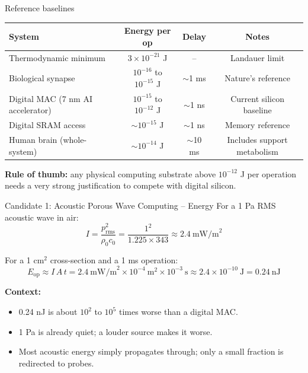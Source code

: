 \documentclass[aspectratio=169,11pt]{beamer}
\begin{document}
\begin{frame}{Reference baselines}
  \small
  \begin{center}
    \begin{tabular}{lccc}
      \toprule
      System & Energy per op & Delay & Notes \\
      \midrule
      Thermodynamic minimum & $3 \times 10^{-21}$ J & -- & Landauer limit \\
      Biological synapse & $10^{-16}$ to $10^{-15}$ J & $\sim$1 ms & Nature's reference \\
      Digital MAC (7 nm AI accelerator) & $10^{-15}$ to $10^{-12}$ J & $\sim$1 ns & Current silicon baseline \\
      Digital SRAM access & $\sim 10^{-15}$ J & $\sim$1 ns & Memory reference \\
      Human brain (whole-system) & $\sim 10^{-14}$ J & $\sim$10 ms & Includes support metabolism \\
      \bottomrule
    \end{tabular}
  \end{center}

  \vspace{0.15cm}
  \textbf{Rule of thumb:} any physical computing substrate above $10^{-12}$ J per operation needs a very strong justification to compete with digital silicon.
\end{frame}

\begin{frame}{Candidate 1: Acoustic Porous Wave Computing -- Energy}
  \small
  For a 1 Pa RMS acoustic wave in air:
  \[
    I = \frac{p_{\text{rms}}^2}{\rho_0 c_0} = \frac{1^2}{1.225 \times 343} \approx 2.4\ \text{mW/m}^2
  \]

  For a 1 cm$^2$ cross-section and a 1 ms operation:
  \[
    E_{\text{op}} \approx I \, A \, t = 2.4\ \text{mW/m}^2 \times 10^{-4}\ \text{m}^2 \times 10^{-3}\ \text{s} \approx 2.4 \times 10^{-10}\ \text{J} = 0.24\ \text{nJ}
  \]

  \vspace{0.1cm}
  \textbf{Context:}
  \begin{itemize}
    \item 0.24 nJ is about $10^2$ to $10^5$ times worse than a digital MAC.
    \item 1 Pa is already quiet; a louder source makes it worse.
    \item Most acoustic energy simply propagates through; only a small fraction is redirected to probes.
  \end{itemize}
\end{frame}
\end{document}
